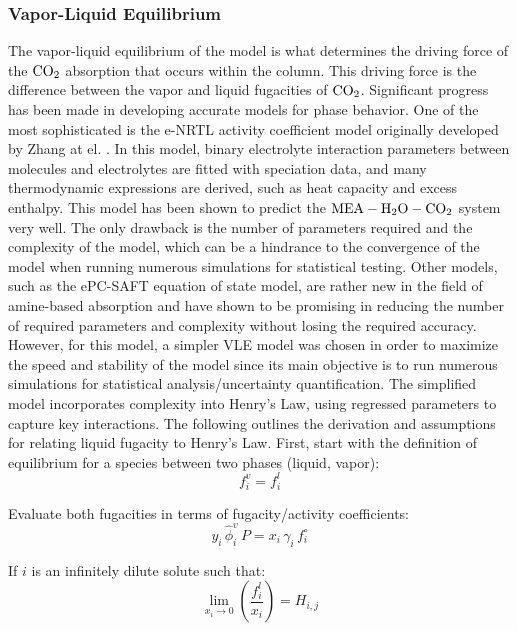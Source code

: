 \documentclass[a4paper,fleqn]{cas-sc}
\newcommand{\COtwo}{{\ce{CO2}}}
\newcommand{\HtwoO}{{\ce{H2O}}}
\newcommand{\MEA}{{\ce{MEA}}}
\begin{document}
    \subsubsection{Vapor-Liquid Equilibrium}
    The vapor-liquid equilibrium of the model is what determines the driving force of the $\COtwo$ absorption that occurs within the column. This driving force is the difference between the vapor and liquid fugacities of $\COtwo$. Significant progress has been made in developing accurate models for phase behavior. One of the most sophisticated is the e-NRTL activity coefficient model originally developed by Zhang at el. \cite{Zhang2011ThermodynamicModel}. In this model, binary electrolyte interaction parameters between molecules and electrolytes are fitted with speciation data, and many thermodynamic expressions are derived, such as heat capacity and excess enthalpy. This model has been shown to predict the $\MEA-\HtwoO-\COtwo$ system very well. The only drawback is the number of parameters required and the complexity of the model, which can be a hindrance to the convergence of the model when running numerous simulations for statistical testing. Other models, such as the ePC-SAFT equation of state model, are rather new in the field of amine-based absorption and have shown to be promising in reducing the number of required parameters and complexity without losing the required accuracy. However, for this model, a simpler VLE model was chosen in order to maximize the speed and stability of the model since its main objective is to run numerous simulations for statistical analysis/uncertainty quantification. The simplified model incorporates complexity into Henry’s Law, using regressed parameters to capture key interactions. The following outlines the derivation and assumptions for relating liquid fugacity to Henry’s Law. First, start with the definition of equilibrium for a species between two phases (liquid, vapor):
    \begin{equation}
        f_i^v = f_i^l
    \end{equation}

    Evaluate both fugacities in terms of fugacity/activity coefficients:
    \begin{equation}
        y_i \, \hat{\phi}_i^v \, P = x_i \, \gamma_i \, f_i^\circ
    \end{equation}

    If $i$ is an infinitely dilute solute such that:
    \begin{equation}
        \lim_{x_i \to 0} \left( \frac{f_i^l}{x_i} \right) = H_{i,j}
    \end{equation}
\end{document}
